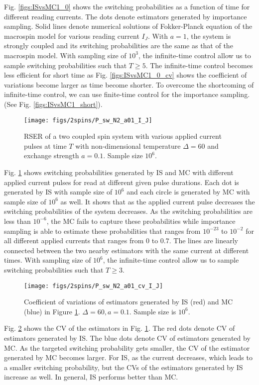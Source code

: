 \documentclass[journal,transmag]{IEEEtran}
\begin{document}
Fig. \ref{figs:ISvsMC1_0} shows the switching probabilities as a function of time for different reading currents.  The dots denote estimators generated by importance sampling. Solid lines denote numerical solutions of Fokker-Planck equation of the macrospin model for various reading current $I_J$. With $a = 1$, the system is strongly coupled and its switching probabilities are the same as that of the macrospin model. With sampling size of $10^3$, the infinite-time control allow us to sample switching probabilities such that $T \ge 5$. The infinite-time control becomes less efficient for short time as Fig. \ref{figs:ISvsMC1_0_cv} shows the coefficient of variations become larger as time become shorter. To overcome the shortcoming of infinite-time control, we can use finite-time control for the importance sampling. (See Fig. \ref{figs:ISvsMC1_short}).
  \begin{figure}[h]
   \centering
         \texttt{[image: figs/2spins/P\_sw\_N2\_a01\_I\_J]}
   \caption{RSER of a two coupled spin system with various applied current pulses at time $T$ with non-dimensional temperature $\Delta = 60$ and exchange strength $ a = 0.1$. Sample size $10^6$.}
   \label{figs:ISvsMC2}
\end{figure}
Fig. \ref{figs:ISvsMC2} shows switching probabilities generated by IS and MC with different applied current pulses for read at different given pulse durations.  Each dot is generated by IS with sample size of $10^6$ and each circle is generated by MC with sample size of $10^6$ as well. It shows that as the applied current pulse decreases the switching probabilities of the system decreases. As the switching probabilities are less than $10^{-6}$, the MC fails to capture these probabilities while importance sampling is able to estimate these probabilities that ranges from $10^{-23}$ to $10^{-2}$ for all different applied currents that  ranges from $0$ to $0.7$.  The lines are linearly connected between the two nearby estimators with the same current at different times. With sampling size of $10^6$, the infinite-time control allow us to sample switching probabilities such that $T \ge 3$.
  \begin{figure}[h]
   \centering
         \texttt{[image: figs/2spins/P\_sw\_N2\_a01\_cv\_I\_J]}
   \caption{Coefficient of variations of estimators generated by IS (red) and MC (blue) in Figure \ref{figs:ISvsMC2}. $\Delta = 60, a = 0.1$. Sample size is $10^6$. }
   \label{figs:ISvsMC2_cv}
\end{figure}
%
Fig. \ref{figs:ISvsMC2_cv} shows the CV of the estimators in Fig. \ref{figs:ISvsMC2}. The red dots denote CV of estimators generated by IS. The blue dots denote CV of estimators generated by MC. As the targeted switching probability gets smaller, the CV of the  estimator generated by MC becomes larger.  For IS, as the current decreases, which leads to a smaller switching probability, but the CVs of the estimators generated by IS increase as well. In general, IS performs better than MC.
\end{document}
